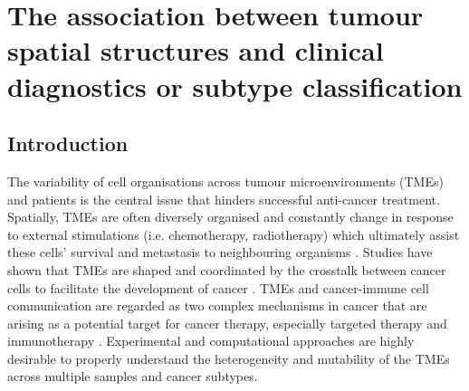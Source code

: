 \chapter[The association between tumour spatial structure and clinical diagnostics]{The association between tumour spatial structures and clinical diagnostics or subtype classification}
\label{Chap:4}	%
\pagestyle{headings}
\label{Sec:4.1_intro}	%
\section{Introduction}
The variability of cell organisations across tumour microenvironments (TMEs) and patients is the central issue that hinders successful anti-cancer treatment. Spatially, TMEs are often diversely organised and constantly change in response to external stimulations (i.e. chemotherapy, radiotherapy) which ultimately assist these cells’ survival and metastasis to neighbouring organisms \cite{wu2022spatial}. Studies have shown that TMEs are shaped and coordinated by the crosstalk between cancer cells to facilitate the development of cancer \cite{jin2020updated, quail2013microenvironmental, schurch2020coordinated}. TMEs and cancer-immune cell communication are regarded as two complex mechanisms in cancer that are arising as a potential target for cancer therapy, especially targeted therapy and immunotherapy \cite{jin2020updated, abou2020integrating, qiu2017reprogramming}. Experimental and computational approaches are highly desirable to properly understand the heterogeneity and mutability of the TMEs across multiple samples and cancer subtypes. 

